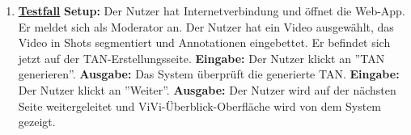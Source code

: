 \begin{enumerate}
	\item \underline{\textbf{Testfall}} \linebreak
	\textbf{Setup:} Der Nutzer hat Internetverbindung und öffnet die Web-App. Er meldet sich als Moderator an. Der Nutzer hat ein Video ausgewählt, das Video in Shots segmentiert und Annotationen eingebettet. Er befindet sich jetzt auf der TAN-Erstellungsseite.\linebreak
	\textbf{Eingabe:} Der Nutzer klickt an ''TAN generieren''.\linebreak
	\textbf{Ausgabe:} Das System überprüft die generierte TAN.\linebreak
	\textbf{Eingabe:} Der Nutzer klickt an ''Weiter''.\linebreak
	\textbf{Ausgabe:} Der Nutzer wird auf der nächsten Seite weitergeleitet und ViVi-Überblick-Oberfläche wird von dem System gezeigt.
	
\end{enumerate}
